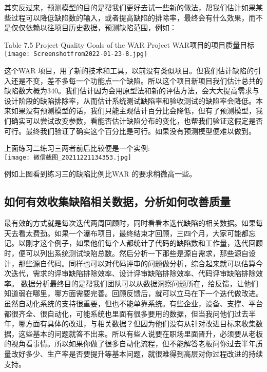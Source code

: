 其实反过来，预测模型的目的是帮我们更好去试一些新的做法，帮我们估计如果某些过程可以降低缺陷数的输入，或者提高缺陷的排除率，最终会有什么效果，而不是仅仅依赖以往项目历史数据，预测缺陷范围，例如：

Table 7.5 Project Quality Goals of the WAR Project
WAR项目的项目质量目标\\
\texttt{[image: Screenshotfrom2022-01-23-8.jpg]}


这个WAR
项目，用了新的技术和工具，以前没有类似项目。但我们估计缺陷的引入还是不变，差不多每一个功能点一个缺陷。所以这个项目新项目我们估计总共的缺陷数大概为340。我们估计因为会用原型法和新的评估方法，会大大提高需求与设计阶段的缺陷排除率，从而估计系统测试缺陷率和验收测试的缺陷率会降低。本来如果没有预测模型的话，我们只能主观估计百分比会降低，但有了预测模型，我们确实可以尝试改变参数，看能否估计缺陷分布的变化，也帮我们验证这假定是否可行。最终我们验证了确实这个百分比是可行。如果没有预测模型便难以做到。

上面练习二练习三两者前后比较便是一个实例:\\

\texttt{[image: 微信截图\_20211221134353.jpg]}

例如上图看到练习三的缺陷比例比WAR 的要求稍微高一些。

\hypertarget{ux5982ux4f55ux6709ux6548ux6536ux96c6ux7f3aux9677ux76f8ux5173ux6570ux636eux5206ux6790ux5982ux4f55ux6539ux5584ux8d28ux91cf}{%
\subsection{如何有效收集缺陷相关数据，分析如何改善质量}\label{ux5982ux4f55ux6709ux6548ux6536ux96c6ux7f3aux9677ux76f8ux5173ux6570ux636eux5206ux6790ux5982ux4f55ux6539ux5584ux8d28ux91cf}}

最有效的方式就是每次迭代两周回顾时，同时看看本迭代缺陷的相关数据。如果每天去看太费劲。如果一个瀑布项目，最终结束才回顾，三四个月，大家可能都忘记。以刚才这个例子，如果他们每个人都统计了代码的缺陷数和工作量，迭代回顾时，便可以列出系统测试缺陷总数。然后分析一下那些是源自需求，那些源自设计，那些源自代码。同样也可以对代码评审的问题做分析，综合起来就可以估算今次迭代，需求的评审缺陷排除效率、设计评审缺陷排除效率、代码评审缺陷排除效率。
数据分析最终目的是帮我们团队可以从数据洞察问题所在，给反馈，让他们知道弱在哪里，哪方面需要完善。回顾反馈后，就可以立马在下一个迭代做改进。虽然自动化系统的支持很重要，但也不能单靠系统。有些企业，设备、支撑、平台都很齐全、很自动化，可能系统也里面有很多要用的数据，但当我问他们过去半年，哪方面有具体的改进，与相关数据？但因为他们没有从针对改进目标来收集数据，这些基本的问题就答不出来。所以有些人说要在职场里面晋升，必须要从老板的视角看事情。所以如果你做了很多自动化流程，但不能解答老板问你过去半年质量改好多少、生产率是否要提升等基本问题，就很难得到高层对你过程改进的持续支持。

